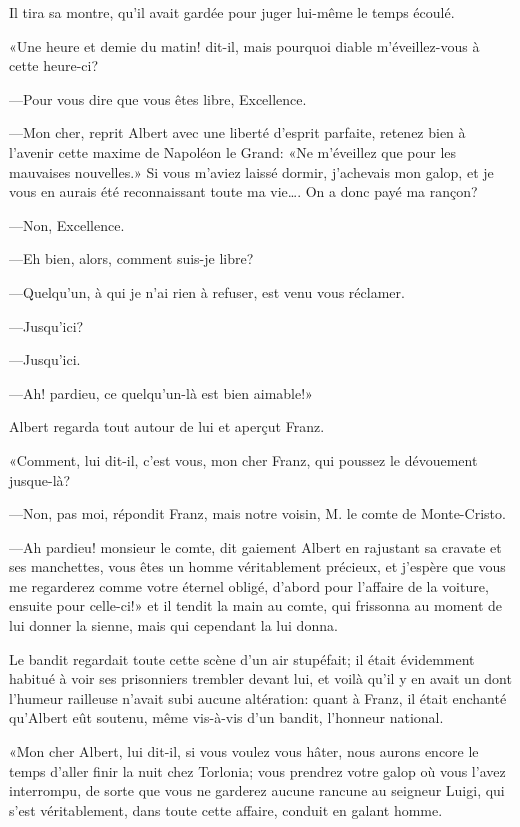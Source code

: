 Il tira sa montre, qu'il avait gardée pour juger lui-même le temps écoulé. 

«Une heure et demie du matin! dit-il, mais pourquoi diable m'éveillez-vous à cette heure-ci? 

—Pour vous dire que vous êtes libre, Excellence. 

—Mon cher, reprit Albert avec une liberté d'esprit parfaite, retenez bien à l'avenir cette maxime de Napoléon le Grand: «Ne m'éveillez que pour les mauvaises nouvelles.» Si vous m'aviez laissé dormir, j'achevais mon galop, et je vous en aurais été reconnaissant toute ma vie\dots. On a donc payé ma rançon? 

—Non, Excellence. 

—Eh bien, alors, comment suis-je libre? 

—Quelqu'un, à qui je n'ai rien à refuser, est venu vous réclamer. 

—Jusqu'ici? 

—Jusqu'ici. 

—Ah! pardieu, ce quelqu'un-là est bien aimable!» 

Albert regarda tout autour de lui et aperçut Franz. 

«Comment, lui dit-il, c'est vous, mon cher Franz, qui poussez le dévouement jusque-là? 

—Non, pas moi, répondit Franz, mais notre voisin, M. le comte de Monte-Cristo. 

—Ah pardieu! monsieur le comte, dit gaiement Albert en rajustant sa cravate et ses manchettes, vous êtes un homme véritablement précieux, et j'espère que vous me regarderez comme votre éternel obligé, d'abord pour l'affaire de la voiture, ensuite pour celle-ci!» et il tendit la main au comte, qui frissonna au moment de lui donner la sienne, mais qui cependant la lui donna. 

Le bandit regardait toute cette scène d'un air stupéfait; il était évidemment habitué à voir ses prisonniers trembler devant lui, et voilà qu'il y en avait un dont l'humeur railleuse n'avait subi aucune altération: quant à Franz, il était enchanté qu'Albert eût soutenu, même vis-à-vis d'un bandit, l'honneur national.  

«Mon cher Albert, lui dit-il, si vous voulez vous hâter, nous aurons encore le temps d'aller finir la nuit chez Torlonia; vous prendrez votre galop où vous l'avez interrompu, de sorte que vous ne garderez aucune rancune au seigneur Luigi, qui s'est véritablement, dans toute cette affaire, conduit en galant homme. 

